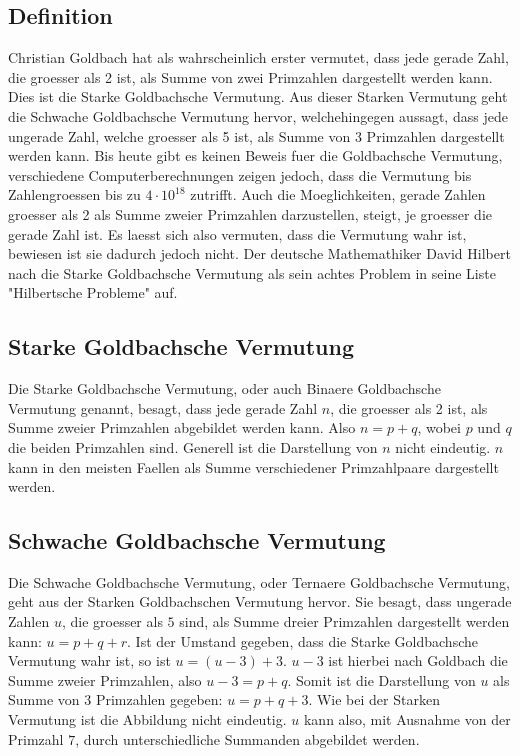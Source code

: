 \subsection{Definition}
Christian Goldbach hat als wahrscheinlich erster vermutet, dass jede gerade Zahl, die groesser als 2 ist, als Summe von zwei Primzahlen dargestellt werden kann. Dies ist die Starke Goldbachsche Vermutung. Aus dieser Starken Vermutung geht die Schwache Goldbachsche Vermutung hervor, welchehingegen aussagt, dass jede ungerade Zahl, welche groesser als 5 ist, als Summe von 3 Primzahlen dargestellt werden kann. Bis heute gibt es keinen Beweis fuer die Goldbachsche Vermutung, verschiedene Computerberechnungen zeigen jedoch, dass die Vermutung  bis Zahlengroessen bis zu $4\cdot10^{18}$ zutrifft. Auch die Moeglichkeiten, gerade Zahlen groesser als 2 als Summe zweier Primzahlen darzustellen, steigt, je groesser die gerade Zahl ist. Es laesst sich also vermuten, dass die Vermutung wahr ist, bewiesen ist sie dadurch jedoch nicht. Der deutsche Mathemathiker David Hilbert nach die Starke Goldbachsche Vermutung als sein achtes Problem in seine Liste "Hilbertsche Probleme" auf.
\subsection{Starke Goldbachsche Vermutung}
Die Starke Goldbachsche Vermutung, oder auch Binaere Goldbachsche Vermutung genannt, besagt, dass jede gerade Zahl $n$, die groesser als 2 ist, als Summe zweier Primzahlen abgebildet werden kann. Also $n = p + q$, wobei $p$ und $q$ die beiden Primzahlen sind. Generell ist die Darstellung von $n$ nicht eindeutig. $n$ kann in den meisten Faellen als Summe verschiedener Primzahlpaare dargestellt werden.
\subsection{Schwache Goldbachsche Vermutung}
Die Schwache Goldbachsche Vermutung, oder Ternaere Goldbachsche Vermutung, geht aus der Starken Goldbachschen Vermutung hervor. Sie besagt, dass ungerade Zahlen $u$, die groesser als $5$ sind, als Summe dreier Primzahlen dargestellt werden kann: $u = p + q + r$. Ist der Umstand gegeben, dass die Starke Goldbachsche Vermutung wahr ist, so ist $u = (u - 3) + 3$. $u - 3$ ist hierbei nach Goldbach die Summe zweier Primzahlen, also $u - 3 = p + q$. Somit ist die Darstellung von $u$ als Summe von 3 Primzahlen gegeben: $u = p + q + 3$. Wie bei der Starken Vermutung ist die Abbildung nicht eindeutig. $u$ kann also, mit Ausnahme von der Primzahl $7$, durch unterschiedliche Summanden abgebildet werden.
